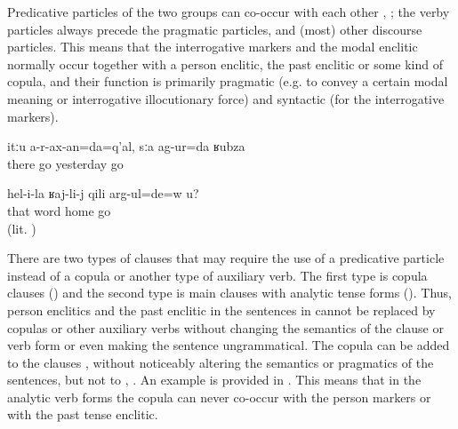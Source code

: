 Predicative particles of the two groups can co-occur with each other , ; the verby particles always precede the pragmatic particles, and (most) other discourse particles. This means that the interrogative markers and the modal enclitic normally occur together with a person enclitic, the past enclitic or some kind of copula, and their function is primarily pragmatic (e.g. to convey a certain modal meaning or interrogative illocutionary force) and syntactic (for the interrogative markers).
%
\begin{exe}
	\ex	\label{ex:‎‎‎Am I will not go there, I went yesterday minor}
	\gll	itːu	a-r-ax-an=da=q'al,	sːa	ag-ur=da	ʁubza\\
		there	go	yesterday	go	\\
	\glt	{}

	\ex	\label{ex:Are you going home because of what she said minor}
	\gll	hel-i-la	ʁaj-li-j	qili	arg-ul=de=w	u?\\
		that	word	home	go	\\
	\glt	{} (lit. )
\end{exe}

There are two types of clauses that may require the use of a predicative particle instead of a copula or another type of auxiliary verb. The first type is copula clauses () and the second type is main clauses with analytic tense forms (). Thus, person enclitics and the past enclitic in the sentences in  cannot be replaced by copulas or other auxiliary verbs without changing the semantics of the clause or verb form or even making the sentence ungrammatical. The copula can be added to the clauses ,  without noticeably altering the semantics or pragmatics of the sentences, but not to , . An example is provided in . This means that in the analytic verb forms the copula can never co-occur with the person markers or with the past tense enclitic.

